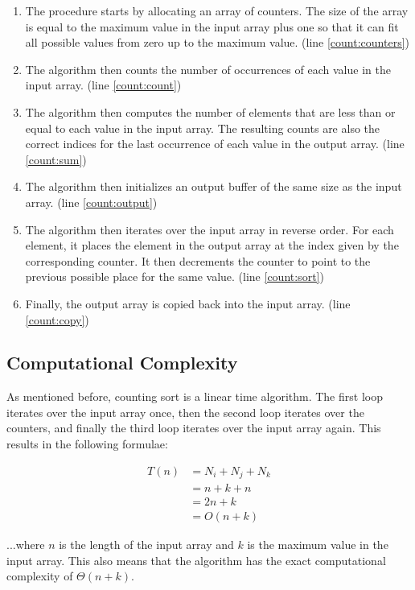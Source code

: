 \begin{enumerate}
    \item The procedure starts by allocating an array of counters. The size of the array is equal to the maximum value in the input array plus one so that it can fit all possible values from zero up to the maximum value. (line \ref{count:counters})
    \item The algorithm then counts the number of occurrences of each value in the input array. (line \ref{count:count})
    \item The algorithm then computes the number of elements that are less than or equal to each value in the input array. The resulting counts are also the correct indices for the last occurrence of each value in the output array. (line \ref{count:sum})
    \item The algorithm then initializes an output buffer of the same size as the input array. (line \ref{count:output})
    \item The algorithm then iterates over the input array in reverse order. For each element, it places the element in the output array at the index given by the corresponding counter. It then decrements the counter to point to the previous possible place for the same value. (line \ref{count:sort})
    \item Finally, the output array is copied back into the input array. (line \ref{count:copy})
\end{enumerate}

\subsection{Computational Complexity}

As mentioned before, counting sort is a linear time algorithm.  The first loop iterates over the input array once, then the second loop iterates over the counters, and finally the third loop iterates over the input array again. This results in the following formulae:

\begin{equation*}
    \begin{aligned}
        T(n) &= N_i + N_j + N_k \\
        &= n + k + n \\
        &= 2n + k \\
        &= O(n + k)
    \end{aligned}
\end{equation*}

...where $n$ is the length of the input array and $k$ is the maximum value in the input array. This also means that the algorithm has the exact computational complexity of $\Theta(n + k)$.

